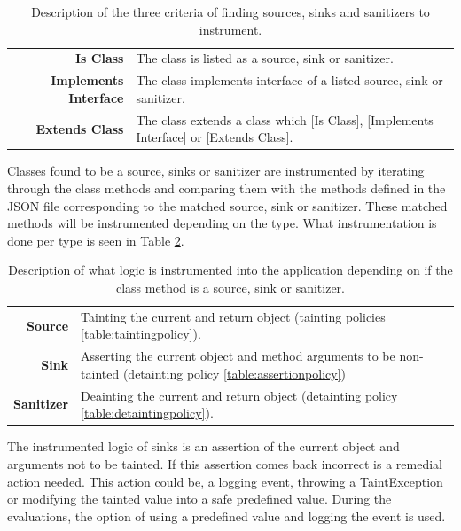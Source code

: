 \begin{table}[H]
    \centering
    \caption{Description of the three criteria of finding sources, sinks and sanitizers to instrument.}
    \label{table:criterias}
    \begin{tabular}{rp{8cm}}
        \textbf{Is Class} & The class is listed as a source, sink or sanitizer. \\
        \textbf{Implements Interface} & The class implements interface of a listed source, sink or sanitizer. \\
        \textbf{Extends Class} & The class extends a class which [Is Class], [Implements Interface] or [Extends Class]. \\
    \end{tabular}
\end{table}

Classes found to be a source, sinks or sanitizer are instrumented by iterating through the class methods and comparing them with the methods defined in the JSON file corresponding to the matched source, sink or sanitizer. These matched methods will be instrumented depending on the type. What instrumentation is done per type is seen in Table \ref{table:instru}. 

\begin{table}[H]
    \centering
    \caption{Description of what logic is instrumented into the application depending on if the class method is a source, sink or sanitizer.}
    \label{table:instru}
    \begin{tabular}{rp{9.5cm}}
        \textbf{Source} & Tainting the current and return object (tainting policies \ref{table:taintingpolicy}). \\
        \textbf{Sink} & Asserting the current object and method arguments to be non-tainted (detainting policy \ref{table:assertionpolicy}) \\
        \textbf{Sanitizer} & Deainting the current and return object (detainting policy \ref{table:detaintingpolicy}). \\
    \end{tabular}
\end{table}

The instrumented logic of sinks is an assertion of the current object and arguments not to be tainted. If this assertion comes back incorrect is a remedial action needed. This action could be, a logging event, throwing a TaintException or modifying the tainted value into a safe predefined value. During the evaluations, the option of using a predefined value and logging the event is used.



